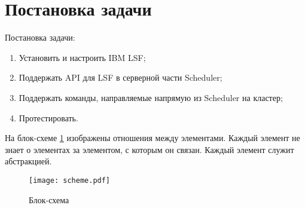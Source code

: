 \section{Постановка задачи}

Постановка задачи:
\begin{enumerate}
    \item Установить и настроить IBM LSF;
    \item Поддержать API для LSF в серверной части Scheduler;
    \item Поддержать команды, направляемые напрямую из Scheduler на кластер;
    \item Протестировать.
\end{enumerate}

На блок-схеме \ref{fig:block-scheme} изображены отношения между элементами. Каждый элемент не знает о элементах за элементом, с которым он связан. Каждый элемент служит абстракцией.

\begin{figure}[h]
    \centering
    \texttt{[image: scheme.pdf]}
    \caption{Блок-схема}
    \label{fig:block-scheme}
\end{figure}

\clearpage
